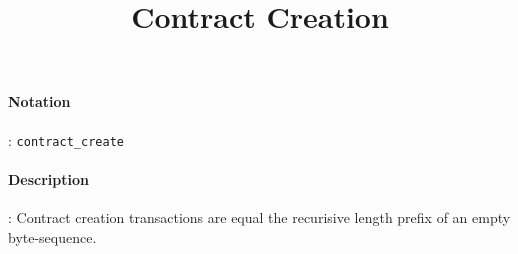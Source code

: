 \documentclass[10pt,a4paper,oneside]{scrartcl}
\author{}
\title{Contract Creation}
\date{}
\begin{document}
\maketitle
\paragraph{Notation}: \texttt{contract\_create}
\paragraph{Description}: Contract creation transactions are equal the recurisive length prefix of an empty byte-sequence. 
\end{document}
